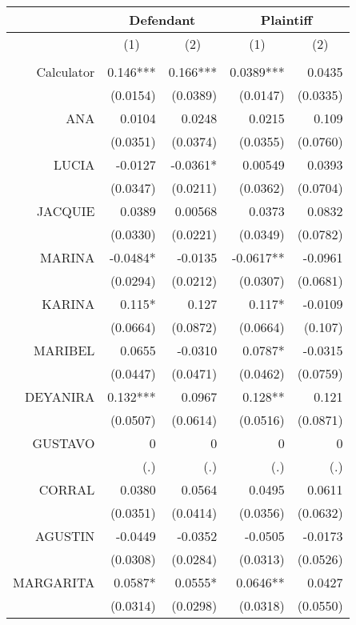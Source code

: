 \begin{tabular}{rrrrr}
\toprule
      & \multicolumn{2}{c}{Defendant} & \multicolumn{2}{c}{Plaintiff } \\
\midrule
      & \multicolumn{1}{c}{(1)} & \multicolumn{1}{c}{(2)} & \multicolumn{1}{c}{(1)} & \multicolumn{1}{c}{(2)} \\
      &       &       &       &  \\
Calculator & 0.146*** & 0.166*** & 0.0389*** & 0.0435 \\
      & (0.0154) & (0.0389) & (0.0147) & (0.0335) \\
ANA   & 0.0104 & 0.0248 & 0.0215 & 0.109 \\
      & (0.0351) & (0.0374) & (0.0355) & (0.0760) \\
LUCIA & -0.0127 & -0.0361* & 0.00549 & 0.0393 \\
      & (0.0347) & (0.0211) & (0.0362) & (0.0704) \\
JACQUIE & 0.0389 & 0.00568 & 0.0373 & 0.0832 \\
      & (0.0330) & (0.0221) & (0.0349) & (0.0782) \\
MARINA & -0.0484* & -0.0135 & -0.0617** & -0.0961 \\
      & (0.0294) & (0.0212) & (0.0307) & (0.0681) \\
KARINA & 0.115* & 0.127 & 0.117* & -0.0109 \\
      & (0.0664) & (0.0872) & (0.0664) & (0.107) \\
MARIBEL & 0.0655 & -0.0310 & 0.0787* & -0.0315 \\
      & (0.0447) & (0.0471) & (0.0462) & (0.0759) \\
DEYANIRA & 0.132*** & 0.0967 & 0.128** & 0.121 \\
      & (0.0507) & (0.0614) & (0.0516) & (0.0871) \\
GUSTAVO & 0     & 0     & 0     & 0 \\
      & (.)   & (.)   & (.)   & (.) \\
CORRAL & 0.0380 & 0.0564 & 0.0495 & 0.0611 \\
      & (0.0351) & (0.0414) & (0.0356) & (0.0632) \\
AGUSTIN & -0.0449 & -0.0352 & -0.0505 & -0.0173 \\
      & (0.0308) & (0.0284) & (0.0313) & (0.0526) \\
MARGARITA & 0.0587* & 0.0555* & 0.0646** & 0.0427 \\
      & (0.0314) & (0.0298) & (0.0318) & (0.0550) \\

\end{tabular}
